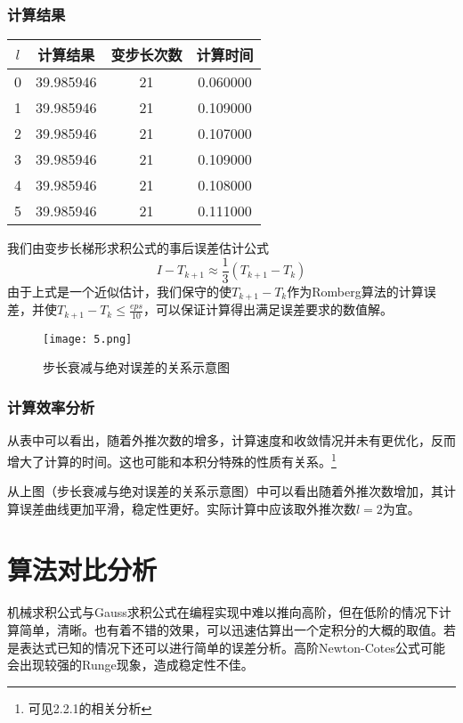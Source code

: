 \documentclass[UTF8]{ctexart}
\begin{document}
	\subsubsection{计算结果}
		\begin{center}
		\begin{tabular}{ |c|c|c|c| } 
			\hline
			$l$  & 计算结果 & 变步长次数 & 计算时间 \\ \hline
			0&39.985946&21&0.060000\\\hline
			1&39.985946&21&0.109000\\\hline
			2&39.985946&21&0.107000\\\hline
			3&39.985946&21&0.109000\\\hline
			4&39.985946&21&0.108000\\\hline
			5&39.985946&21&0.111000\\\hline
		\end{tabular}
	\end{center}
	
	我们由变步长梯形求积公式的事后误差估计公式
	\[I - T_{k+1} \approx \frac{1}{3}(T_{k+1}-T_{k})\]
	由于上式是一个近似估计，我们保守的使$T_{k+1}-T_{k}$作为Romberg算法的计算误差，并使$T_{k+1}-T_{k}\leq \frac{eps}{10}$，可以保证计算得出满足误差要求的数值解。
	
	\begin{figure}[h]
		\centerline{\texttt{[image: 5.png]}}
		\caption*{步长衰减与绝对误差的关系示意图}
	\end{figure}
	
	\subsubsection{计算效率分析}
	
	从表中可以看出，随着外推次数的增多，计算速度和收敛情况并未有更优化，反而增大了计算的时间。这也可能和本积分特殊的性质有关系。\footnote{可见2.2.1的相关分析}
	
	从上图（步长衰减与绝对误差的关系示意图）中可以看出随着外推次数增加，其计算误差曲线更加平滑，稳定性更好。实际计算中应该取外推次数$l = 2$为宜。
	
	\section{算法对比分析}
	
	机械求积公式与Gauss求积公式在编程实现中难以推向高阶，但在低阶的情况下计算简单，清晰。也有着不错的效果，可以迅速估算出一个定积分的大概的取值。若是表达式已知的情况下还可以进行简单的误差分析。高阶Newton-Cotes公式可能会出现较强的Runge现象，造成稳定性不佳。
	
\end{document}
